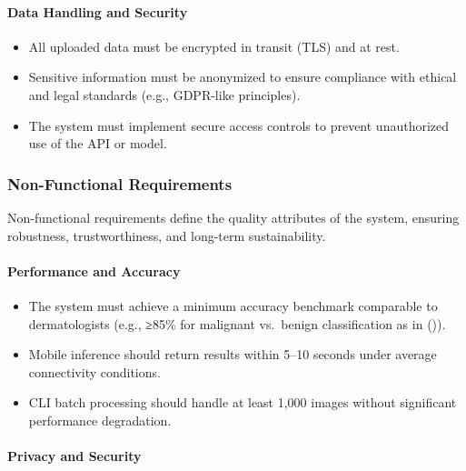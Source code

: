 \documentclass[
  12pt,
  oneside]{article}
\providecommand{\tightlist}{%
  \setlength{\itemsep}{0pt}\setlength{\parskip}{0pt}}
\begin{document}
\paragraph{Data Handling and Security}\label{data-handling-and-security}

\begin{itemize}
\tightlist
\item
  All uploaded data must be encrypted in transit (TLS) and at rest.\\
\item
  Sensitive information must be anonymized to ensure compliance with
  ethical and legal standards (e.g., GDPR-like principles).\\
\item
  The system must implement secure access controls to prevent
  unauthorized use of the API or model.
\end{itemize}

\subsubsection{Non-Functional
Requirements}\label{non-functional-requirements}

Non-functional requirements define the quality attributes of the system,
ensuring robustness, trustworthiness, and long-term sustainability.

\paragraph{Performance and Accuracy}\label{performance-and-accuracy}

\begin{itemize}
\tightlist
\item
  The system must achieve a minimum accuracy benchmark comparable to
  dermatologists (e.g., ≥85\% for malignant vs.~benign classification as
  in ()).\\
\item
  Mobile inference should return results within 5--10 seconds under
  average connectivity conditions.\\
\item
  CLI batch processing should handle at least 1,000 images without
  significant performance degradation.
\end{itemize}

\paragraph{Privacy and Security}\label{privacy-and-security}
\end{document}
